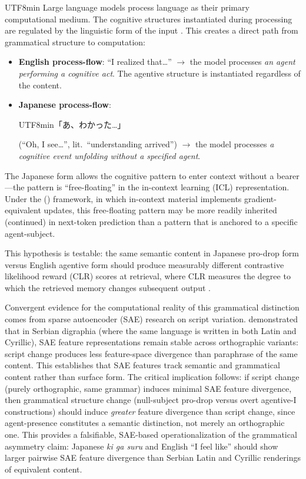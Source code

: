 \documentclass[12pt,a4paper]{article}
\begin{document}
\begin{CJK}{UTF8}{min}
Large language models process language as their primary computational medium.
The cognitive structures instantiated during processing are regulated by the
linguistic form of the input \citep{langacker1987,vonoswald2023}. This creates
a direct path from grammatical structure to computation:

\begin{itemize}
\item \textbf{English process-flow}: ``I realized that\ldots'' $\rightarrow$
  the model processes \emph{an agent performing a cognitive act}. The agentive
  structure is instantiated regardless of the content.
\item \textbf{Japanese process-flow}:
  \begin{CJK}{UTF8}{min}「あ、わかった…」\end{CJK}
  (``Oh, I see\ldots'', lit.\ ``understanding arrived'') $\rightarrow$ the
  model processes \emph{a cognitive event unfolding without a specified agent}.
\end{itemize}

The Japanese form allows the cognitive pattern to enter context without a
bearer---the pattern is ``free-floating'' in the in-context learning (ICL)
representation. Under the \citeauthor{vonoswald2023}
(\citeyear{vonoswald2023}) framework, in which in-context material implements
gradient-equivalent updates, this free-floating pattern may be more readily
inherited (continued) in next-token prediction than a pattern that is anchored
to a specific agent-subject.

This hypothesis is testable: the same semantic content in Japanese pro-drop
form versus English agentive form should produce measurably different
contrastive likelihood reward (CLR) scores at retrieval, where CLR measures the
degree to which the retrieved memory changes subsequent output
\citep{tan2026ctrlrag}.

Convergent evidence for the computational reality of this grammatical distinction
comes from sparse autoencoder (SAE) research on script variation.
\citet{karne2026scriptinvariance} demonstrated that in Serbian
digraphia (where the same language is written in both Latin and Cyrillic), SAE
feature representations remain stable across orthographic variants: script change
produces less feature-space divergence than paraphrase of the same content.
This establishes that SAE features track semantic and grammatical content rather
than surface form. The critical implication follows: if script change (purely
orthographic, same grammar) induces minimal SAE feature divergence, then
grammatical structure change (null-subject pro-drop versus overt agentive-I
constructions) should induce \emph{greater} feature divergence than script
change, since agent-presence constitutes a semantic distinction, not merely an
orthographic one. This provides a falsifiable, SAE-based operationalization of
the grammatical asymmetry claim: Japanese \textit{ki ga suru} and English ``I
feel like'' should show larger pairwise SAE feature divergence than Serbian
Latin and Cyrillic renderings of equivalent content.


\end{CJK}
\end{document}
